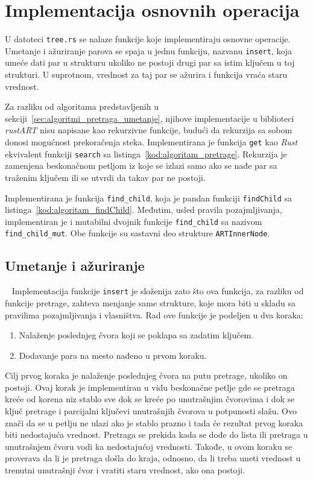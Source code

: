 \documentclass[12pt,oneside]{memoir}
\begin{document}
\section{Implementacija osnovnih operacija}
U datoteci \texttt{tree.rs} se nalaze funkcije koje implementiraju
osnovne operacije.
Umetanje i ažuriranje parova se spaja u jednu funkciju,
nazvanu \texttt{insert}, koja umeće dati par
u strukturu ukoliko ne postoji drugi par sa istim ključem u toj strukturi.
U suprotnom, vrednost za taj par se ažurira i funkcija vraća staru vrednost.

Za razliku od algoritama predstavljenih u
sekciji~\ref{sec:algoritmi_pretraga_umetanje}, njihove implementacije u
biblioteci \textit{rustART} nisu napisane kao rekurzivne funkcije,
budući da rekurzija sa sobom donosi mogućnost prekoračenja
steka. Implementirana je
funkcija \texttt{get} kao \textit{Rust} ekvivalent funkciji
\texttt{search} sa listinga~\ref{kod:algoritam_pretrage}.
Rekurzija je zamenjena beskonačnom petljom iz koje se izlazi samo
ako se nađe par sa traženim ključem ili se utvrdi da takav par
ne postoji.

Implementirana je funkcija \texttt{find\_child},
koja je pandan funkciji \texttt{findChild}
sa listinga~\ref{kod:algoritam_findChild}. Međutim, usled
pravila pozajmljivanja, implementiran je i mutabilni dvojnik
funkcije \texttt{find\_child}
sa nazivom \texttt{find\_child\_mut}. Obe funkcije su sastavni
deo strukture \texttt{ARTInnerNode}.

\newpage

\subsection{Umetanje i ažuriranje}~\label{subsec:umetanje_azururanje}
Implementacija funkcije \texttt{insert} je složenija
zato što ova funkcija, za razliku od funkcije pretrage, zahteva
menjanje same strukture, koje mora biti u skladu sa pravilima
pozajmljivanja i vlasništva. Rad ove funkcije je podeljen u
dva koraka:

\begin{enumerate}
  \item Nalaženje poslednjeg
        čvora koji se poklapa sa zadatim ključem.

  \item Dodavanje para na mesto nađeno u prvom koraku.
\end{enumerate}

Cilj prvog koraka je nalaženje poslednjeg čvora
na putu pretrage, ukoliko on postoji.
Ovaj korak je implementiran u vidu beskonačne petlje
gde se pretraga kreće od korena
niz stablo sve dok se kreće po unutrašnjim čvorovima i dok se ključ
pretrage i parcijalni ključevi unutrašnjih čvorova u potpunosti slažu.
Ovo znači da se u petlju ne ulazi ako je stablo prazno i tada će
rezultat prvog koraka biti nedostajuća vrednost.
Pretraga se prekida kada se dođe do lista ili pretraga u unutrašnjem
čvoru vodi ka nedostajućoj vrednosti.
Takođe, u ovom koraku se proverava da li je pretraga došla do kraja,
odnosno, da li treba uneti vrednost u trenutni unutrašnji čvor
i vratiti staru vrednost, ako ona postoji.
\end{document}
